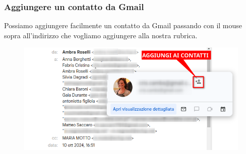 \documentclass[handout]{beamer}
\begin{document}
\begin{frame}
\frametitle{Aggiungere un contatto da Gmail}
Possiamo aggiungere facilmente un contatto da Gmail passando con il mouse sopra all'indirizzo che vogliamo aggiungere alla nostra rubrica.

\begin{figure}
  \includegraphics[width=.8\columnwidth]{img/aggiungicontatto.png}
\end{figure}
\end{frame}
\end{document}
